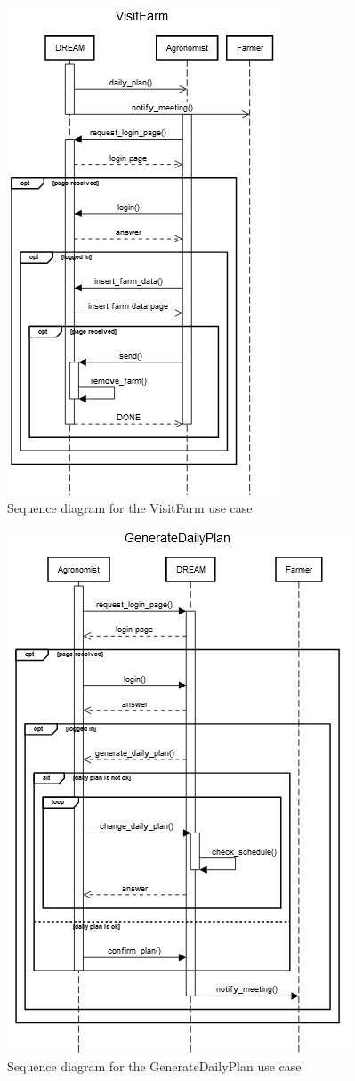 \documentclass{article}
\begin{document}
\begin{figure}[h]
    \centering
    \includegraphics[scale=0.75]{sequence_diagrams/VisitFarm}
    \caption{Sequence diagram for the VisitFarm use case}
\end{figure}

\begin{figure}[h]
    \centering
    \includegraphics[scale=0.75]{sequence_diagrams/GenerateDailyPlan}
    \caption{Sequence diagram for the GenerateDailyPlan use case}
\end{figure}
\end{document}
